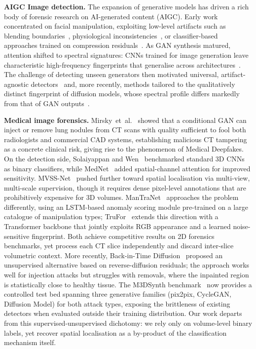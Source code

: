 \documentclass[sigconf, screen, review, anonymous]{acmart}
\begin{document}
\noindent\textbf{AIGC Image detection.}
The expansion of generative models has driven a rich body of forensic research on AI-generated content (AIGC). Early work concentrated on facial manipulation, exploiting low-level artifacts such as blending boundaries~\cite{rossler2019faceforensics++}, physiological inconsistencies~\cite{matern2019exploiting}, or classifier-based approaches trained on compression residuals~\cite{afchar2018mesonet}. As GAN synthesis matured, attention shifted to spectral signatures: CNNs trained for image generation leave characteristic high-frequency fingerprints that generalise across architectures~\cite{wang2020cnn, frank2020leveraging}. The challenge of detecting unseen generators then motivated universal, artifact-agnostic detectors~\cite{tan2024rethinking, yang2025d, pontorno2025deepfeaturex} and, more recently, methods tailored to the qualitatively distinct fingerprint of diffusion models, whose spectral profile differs markedly from that of GAN outputs~\cite{corvi2023detection, pontorno2024exploitation}.

\noindent\textbf{Medical image forensics.}
Mirsky~et~al.~\cite{mirsky2019ct} showed that a conditional GAN can inject or remove lung nodules from CT scans with quality sufficient to fool both radiologists and commercial CAD systems, establishing malicious CT tampering as a concrete clinical risk, giving rise to the phenomenon of Medical Deepfakes. On the detection side, Solaiyappan and Wen~\cite{solaiyappan2022machine} benchmarked standard 3D CNNs as binary classifiers, while MedNet~\cite{albahli2024mednet} added spatial-channel attention for improved sensitivity. MVSS-Net~\cite{chen2021image} pushed further toward spatial localisation via multi-view, multi-scale supervision, though it requires dense pixel-level annotations that are prohibitively expensive for 3D volumes. ManTraNet~\cite{wu2019mantra} approaches the problem differently, using an LSTM-based anomaly scoring module pre-trained on a large catalogue of manipulation types; TruFor~\cite{guillaro2023trufor} extends this direction with a Transformer backbone that jointly exploits RGB appearance and a learned noise-sensitive fingerprint. Both achieve competitive results on 2D forensics benchmarks, yet process each CT slice independently and discard inter-slice volumetric context. More recently, Back-in-Time Diffusion~\cite{grabovski2025back} proposed an unsupervised alternative based on reverse-diffusion residuals; the approach works well for injection attacks but struggles with removals, where the inpainted region is statistically close to healthy tissue. The M3DSynth benchmark~\cite{zingarini2024m3dsynth} now provides a controlled test bed spanning three generative families (pix2pix, CycleGAN, Diffusion Model) for both attack types, exposing the brittleness of existing detectors when evaluated outside their training distribution. Our work departs from this supervised-unsupervised dichotomy: we rely only on volume-level binary labels, yet recover spatial localisation as a by-product of the classification mechanism itself.
\end{document}
